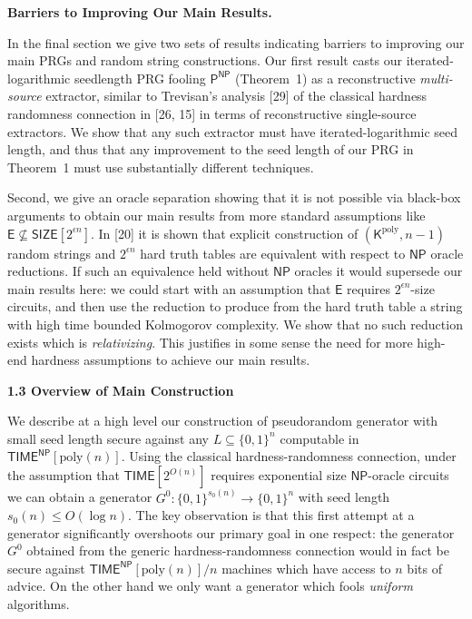 \par\medskip\noindent\textbf{Barriers to Improving Our Main Results.}\par




In the final section we give two sets of results indicating barriers to improving our main PRGs and random string constructions. Our first result casts our iterated-logarithmic seedlength PRG fooling ${\mathsf{P}}^{{\mathsf{NP}}}$ (Theorem 1) as a reconstructive \emph{multi-source} extractor, similar to Trevisan’s analysis [29] of the classical hardness randomness connection in [26, 15] in terms of reconstructive single-source extractors. We show that any such extractor must have iterated-logarithmic seed length, and thus that any improvement to the seed length of our PRG in Theorem 1 must use substantially different techniques.\par




Second, we give an oracle separation showing that it is not possible via black-box arguments to obtain our main results from more standard assumptions like ${\mathsf{E}}\not\subseteq{\mathsf{SIZE}}[2^{\epsilon n}]$. In [20] it is shown that explicit construction of $({\mathsf{K}}^{\mathrm{poly}},n-1)$ random strings and $2^{\epsilon n}$ hard truth tables are equivalent with respect to ${\mathsf{NP}}$ oracle reductions. If such an equivalence held without ${\mathsf{NP}}$ oracles it would supersede our main results here: we could start with an assumption that ${\mathsf{E}}$ requires $2^{\epsilon n}$-size circuits, and then use the reduction to produce from the hard truth table a string with high time bounded Kolmogorov complexity. We show that no such reduction exists which is \emph{relativizing}. This justifies in some sense the need for more high-end hardness assumptions to achieve our main results.\par






\par\medskip\noindent\textbf{
1.3 Overview of Main Construction}\par




We describe at a high level our construction of pseudorandom generator with small seed length secure against any $L\subseteq\{0,1\}^{n}$ computable in ${\mathsf{TIME}}^{\mathsf{NP}}[\mathrm{poly}(n)]$. Using the classical hardness-randomness connection, under the assumption that ${\mathsf{TIME}}[2^{O(n)}]$ requires exponential size ${\mathsf{NP}}$-oracle circuits we can obtain a generator $G^{0}:\{0,1\}^{s_{0}(n)}\to\{0,1\}^{n}$ with seed length $s_{0}(n)\leq O(\log n)$. The key observation is that this first attempt at a generator significantly overshoots our primary goal in one respect: the generator $G^{0}$ obtained from the generic hardness-randomness connection would in fact be secure against ${\mathsf{TIME}}^{\mathsf{NP}}[\mathrm{poly}(n)]/n$ machines which have access to $n$ bits of advice. On the other hand we only want a generator which fools \emph{uniform} algorithms.\par




